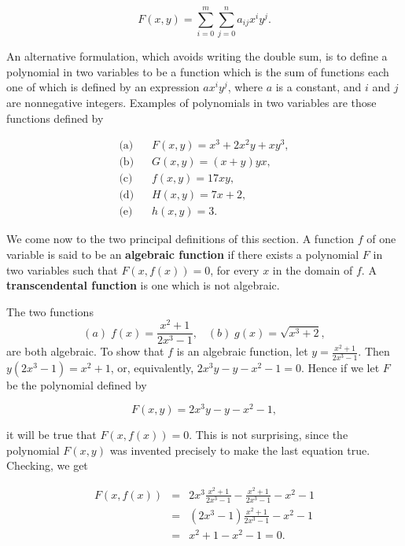 $$
F(x, y) = \sum_{i = 0}^{m} \sum_{j = 0}^{n} a_{i j} x^{i} y^{j}.
$$

\noindent An alternative formulation, which avoids writing the double sum, is to define a polynomial in
two variables to be a function which is the sum of functions
each one of which is defined by an expression $ax^{i}y^{j}$, where $a$ is a constant, and $i$ and $j$ are nonnegative integers. Examples of polynomials in two variables are those functions defined by

$$
\begin{array}{ll}
\mbox{(a)}\;\;\; & F(x, y) = x^3 + 2x^{2}y + xy^{3}, \\
\mbox{(b)}\;\;\; & G(x, y) = (x + y)yx, \\
\mbox{(c)}\;\;\; & f(x, y) = 17xy, \\
\mbox{(d)}\;\;\; & H(x, y) = 7x + 2,\\
\mbox{(e)}\;\;\; & h(x, y) = 3.
\end{array}
$$

We come now to the two principal definitions of this section. A function $f$ of one variable is said
to be an \textbf{algebraic function} if there exists a polynomial $F$ in two variables such that $F(x, f(x)) = 0$, for every $x$ in the domain of $f$.  A  \textbf{transcendental function} is one which is not algebraic.

\begin{example} The two functions 
$$
(a)\; f(x) = \frac{x^2 + 1}{2x^3 - 1},  \;\;\;(b)\; g(x) = \sqrt{x^3 + 2},
$$
\noindent are both algebraic. To show that $f$ is an algebraic function, let $y = \frac{x^2 + 1}{2x^3 - 1}$. Then $y(2x^3 - 1) = x^2 + 1$, or, equivalently, $ 2x^{3}y - y - x^{2} -1 = 0$. Hence if we let $F$ be the
polynomial defined by

$$
F(x, y) = 2x^{3}y - y - x^{2} - 1,
$$

\noindent it will be true that $F(x, f(x)) = 0$. This is not surprising, since the polynomial $F(x, y)$ was
invented precisely to make the last equation true. Checking, we get


\begin{eqnarray*}
F(x, f(x)) &=& 2x^{3} \frac{x^{2} + 1}{2x^3 - 1} - \frac{x^{2} + 1}{2x^{3} - 1} - x^2 - 1\\
              &=& (2x^3 - 1) \frac{x^2 +1}{2x^3 - 1}  - x^2 - 1 \\
              &=&  x^2 + 1 - x^2 - 1 = 0.
\end{eqnarray*}
\end{example}

